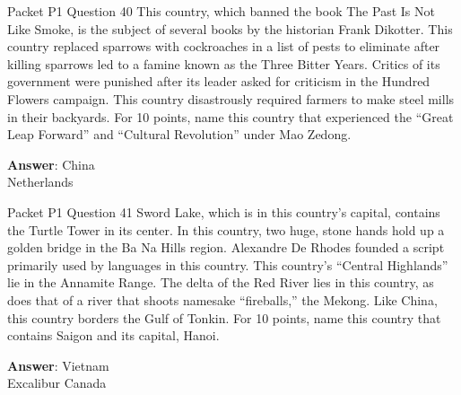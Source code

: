 \begin{frame}{Packet P1 Question 40}
This country, which banned the book The Past Is Not Like Smoke,   is the subject of   several books by the historian Frank Dikotter. This country   replaced sparrows with cockroaches in a list of pests to eliminate after killing   sparrows led to a famine known as the Three Bitter Years. Critics of its government were punished after its leader asked for criticism in the Hundred Flowers campaign. This country disastrously required farmers to make steel mills in their backyards. For 10 points, name this country that experienced the “Great Leap Forward” and “Cultural Revolution” under Mao Zedong.  

\textbf{Answer}: China\\
 Netherlands
\end{frame}

\begin{frame}{Packet P1 Question 41}
Sword Lake, which is in   this country's capital, contains the Turtle Tower in its center. In this country, two huge, stone hands hold up a golden bridge in the Ba Na Hills region. Alexandre De Rhodes founded a script primarily used by languages   in this country. This   country's ``Central Highlands'' lie in the Annamite Range. The delta of the Red   River lies in this country, as does that of a river that shoots namesake ``fireballs,'' the Mekong. Like China, this country borders the Gulf of Tonkin. For 10 points, name this country that contains Saigon and its capital, Hanoi.  

\textbf{Answer}: Vietnam\\
 Excalibur
 Canada
\end{frame}

